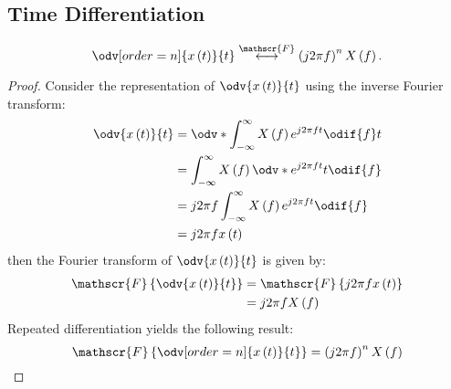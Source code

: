 \documentclass{article}
\begin{document}
\subsection{Time Differentiation}
\begin{equation*}
    \odv[order=n]{x\left( t \right)}{t} \overset{\mathscr{F}}{\longleftrightarrow} \left( j 2\pi f \right)^n X\left( f \right).
\end{equation*}
\begin{proof}
    Consider the representation of \(\odv{x\left( t \right)}{t}\) using the inverse Fourier transform:
    \begin{align*}
        \odv{x\left( t \right)}{t} & = \odv*{\int_{-\infty}^\infty X\left( f \right) e^{j 2\pi f t}\odif{f}}{t} \\
                                   & = \int_{-\infty}^\infty X\left( f \right) \odv*{e^{j 2\pi f t}}{t}\odif{f} \\
                                   & = j 2\pi f \int_{-\infty}^\infty X\left( f \right) e^{j 2\pi f t}\odif{f}  \\
                                   & = j 2\pi f x\left( t \right)
    \end{align*}
    then the Fourier transform of \(\odv{x\left( t \right)}{t}\) is given by:
    \begin{align*}
        \mathscr{F}\left\{ \odv{x\left( t \right)}{t} \right\} & = \mathscr{F}\left\{ j 2\pi f x\left( t \right) \right\} \\
                                                               & = j 2\pi f X\left( f \right)
    \end{align*}
    Repeated differentiation yields the following result:
    \begin{equation*}
        \mathscr{F}\left\{ \odv[order=n]{x\left( t \right)}{t} \right\} = \left( j 2\pi f \right)^n X\left( f \right)
    \end{equation*}
\end{proof}
\end{document}

